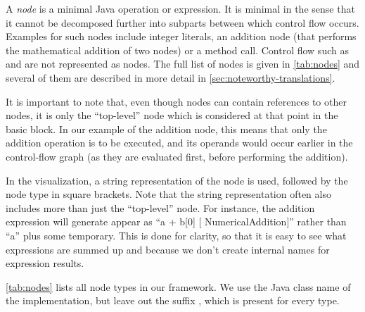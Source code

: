 \begin{definition}[Nodes]
    \label{def:node}
    A \emph{node} is a minimal Java operation or expression.
    It is minimal in the sense that it cannot be decomposed further into subparts
    between which control flow occurs. Examples for such nodes include integer literals,
    an addition node (that performs the mathematical addition of two nodes) or a method call.
    Control flow such as  and  are not represented as nodes.
    The full list of nodes is given in \autoref{tab:nodes} and several of them
    are described in more detail in \autoref{sec:noteworthy-translations}.
    
    It is important to note that, even though nodes can contain references to other nodes,
    it is only the ``top-level'' node which is considered at that point in the basic
    block. In our example of the addition node, this means that only the addition operation
    is to be executed, and its operands would occur earlier in the control-flow graph
    (as they are evaluated first, before performing the addition).
\end{definition}

In the visualization, a string representation of the node is used, followed by
the node type in square brackets. Note that the string representation often also includes
more than just the ``top-level'' node. For instance, the addition expression 
will generate appear as ``a + b[0] [ NumericalAddition]'' rather than ``a'' plus some temporary.
This is done for clarity, so that it is easy to see what expressions are summed up and because
we don't create internal names for expression results.

\autoref{tab:nodes} lists all node types in our framework. We use the
Java class name of the implementation, but leave out the suffix , which is present
for every type.

